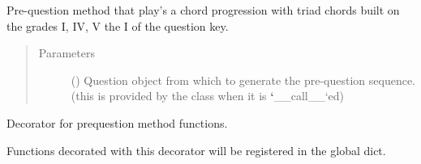 \documentclass[letterpaper,10pt,english]{sphinxmanual}
\begin{document}
\begin{fulllineitems}
\label{\detokenize{index:birdears.prequestion.progression_i_iv_v_i}}
Pre-question method that play’s a chord progression with triad chords
built on the grades I, IV, V the I of the question key.
\begin{quote}\begin{description}
\item[{Parameters}] \leavevmode
{} () \textendash{} Question object from which to generate the
pre-question sequence. (this is provided by the  class
when it is {\color{red}\bfseries{}{}`}\_\_call\_\_{}`ed)

\end{description}\end{quote}

\end{fulllineitems}


\begin{fulllineitems}
\label{\detokenize{index:birdears.prequestion.register_prequestion_method}}
Decorator for prequestion method functions.

Functions decorated with this decorator will be registered in the
 global dict.

\end{fulllineitems}

\end{document}
